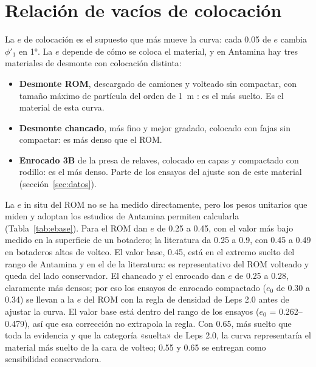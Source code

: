 \documentclass[11pt,letterpaper]{article}
\begin{document}
\section{Relación de vacíos de colocación}\label{sec:e}
La $e$ de colocación es el supuesto que más mueve la curva: cada 0.05 de $e$ cambia $\phi'_1$ en 1°. La $e$ depende de cómo se coloca el material, y en Antamina hay tres materiales de desmonte con colocación distinta:
\begin{itemize}
\item \textbf{Desmonte ROM}, descargado de camiones y volteado sin compactar, con tamaño máximo de partícula del orden de 1~m \citep[Tabla~3-1]{stantec2026iff}: es el más suelto. Es el material de esta curva.
\item \textbf{Desmonte chancado}, más fino y mejor gradado, colocado con fajas sin compactar: es más denso que el ROM.
\item \textbf{Enrocado 3B} de la presa de relaves, colocado en capas y compactado con rodillo: es el más denso. Parte de los ensayos del ajuste son de este material (sección~\ref{sec:datos}).
\end{itemize}
La $e$ in situ del ROM no se ha medido directamente, pero los pesos unitarios que miden y adoptan los estudios de Antamina permiten calcularla (Tabla~\ref{tab:ebase}). Para el ROM dan $e$ de 0.25 a 0.45, con el valor más bajo medido en la superficie de un botadero; la literatura da 0.25 a 0.9, con 0.45 a 0.49 en botaderos altos de volteo. El valor base, 0.45, está en el extremo suelto del rango de Antamina y en el de la literatura: es representativo del ROM volteado y queda del lado conservador. El chancado y el enrocado dan $e$ de 0.25 a 0.28, claramente más densos; por eso los ensayos de enrocado compactado ($e_0$ de 0.30 a 0.34) se llevan a la $e$ del ROM con la regla de densidad de Leps 2.0 antes de ajustar la curva. El valor base está dentro del rango de los ensayos ($e_0$ = 0.262--0.479), así que esa corrección no extrapola la regla. Con 0.65, más suelto que toda la evidencia y que la categoría «suelta» de Leps 2.0, la curva representaría el material más suelto de la cara de volteo; 0.55 y 0.65 se entregan como sensibilidad conservadora.
\end{document}
